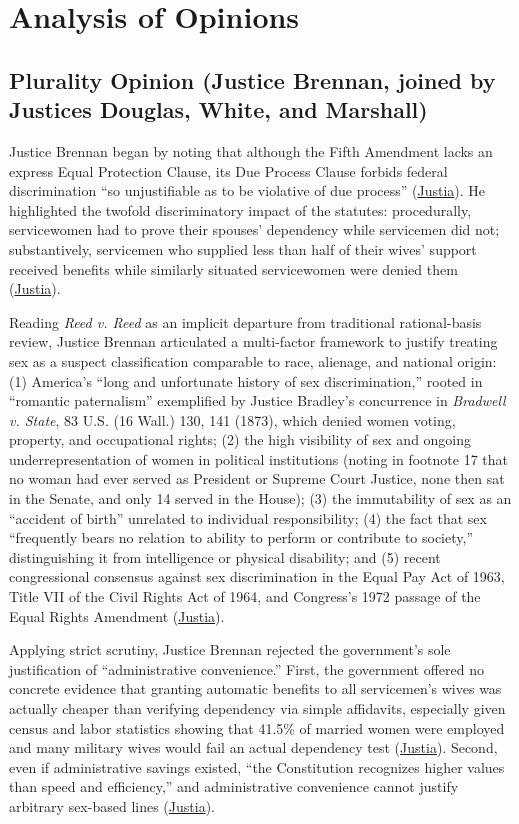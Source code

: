 \documentclass[12pt]{article}
\begin{document}
\section{Analysis of Opinions}

\subsection{Plurality Opinion (Justice Brennan, joined by Justices Douglas, White, and Marshall)}
Justice Brennan began by noting that although the Fifth Amendment lacks an express Equal Protection Clause, its Due Process Clause forbids federal discrimination ``so unjustifiable as to be violative of due process'' (\href{https://supreme.justia.com/cases/federal/us/411/677/}{Justia}). He highlighted the twofold discriminatory impact of the statutes: procedurally, servicewomen had to prove their spouses' dependency while servicemen did not; substantively, servicemen who supplied less than half of their wives' support received benefits while similarly situated servicewomen were denied them (\href{https://supreme.justia.com/cases/federal/us/411/677/}{Justia}).

Reading \textit{Reed v. Reed} as an implicit departure from traditional rational-basis review, Justice Brennan articulated a multi-factor framework to justify treating sex as a suspect classification comparable to race, alienage, and national origin: (1) America's ``long and unfortunate history of sex discrimination,'' rooted in ``romantic paternalism'' exemplified by Justice Bradley's concurrence in \textit{Bradwell v. State}, 83 U.S. (16 Wall.) 130, 141 (1873), which denied women voting, property, and occupational rights; (2) the high visibility of sex and ongoing underrepresentation of women in political institutions (noting in footnote 17 that no woman had ever served as President or Supreme Court Justice, none then sat in the Senate, and only 14 served in the House); (3) the immutability of sex as an ``accident of birth'' unrelated to individual responsibility; (4) the fact that sex ``frequently bears no relation to ability to perform or contribute to society,'' distinguishing it from intelligence or physical disability; and (5) recent congressional consensus against sex discrimination in the Equal Pay Act of 1963, Title VII of the Civil Rights Act of 1964, and Congress's 1972 passage of the Equal Rights Amendment (\href{https://supreme.justia.com/cases/federal/us/411/677/}{Justia}).

Applying strict scrutiny, Justice Brennan rejected the government's sole justification of ``administrative convenience.'' First, the government offered no concrete evidence that granting automatic benefits to all servicemen's wives was actually cheaper than verifying dependency via simple affidavits, especially given census and labor statistics showing that 41.5\% of married women were employed and many military wives would fail an actual dependency test (\href{https://supreme.justia.com/cases/federal/us/411/677/}{Justia}). Second, even if administrative savings existed, ``the Constitution recognizes higher values than speed and efficiency,'' and administrative convenience cannot justify arbitrary sex-based lines (\href{https://supreme.justia.com/cases/federal/us/411/677/}{Justia}).
\end{document}
